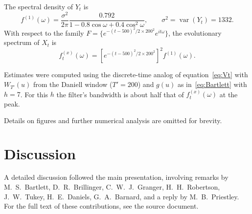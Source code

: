 \documentclass[12pt]{article}
\theoremstyle{definition}
\theoremstyle{plain}
\theoremstyle{remark}
\begin{document}
The spectral density of $Y_t$ is
\begin{equation}
f^{(1)}(\omega) = \frac{\sigma^2}{2\pi} \frac{0.792}{1 - 0.8 \cos \omega + 0.4 \cos^2 \omega}, \qquad \sigma^2 = \operatorname{var}(Y_t) = 1332.
\end{equation}
With respect to the family $F = \{ e^{-(t-500)^2 / 2 \times 200^2} e^{i t \omega}\}$, the evolutionary spectrum of $X_t$ is
\begin{equation}
f^{(x)}_t(\omega) = [e^{-(t-500)^2 / 2 \times 200^2}]^2 f^{(1)}(\omega).
\end{equation}

Estimates were computed using the discrete-time analog of equation~\eqref{eq:Vt} with $W_{T'}(u)$ from the Daniell window ($T'=200$) and $g(u)$ as in~\eqref{eq:Bartlett} with $h=7$. For this $h$ the filter's bandwidth is about half that of $f^{(x)}_t(\omega)$ at the peak.

Details on figures and further numerical analysis are omitted for brevity.

\section*{Discussion}

A detailed discussion followed the main presentation, involving remarks by M.~S.~Bartlett, D.~R.~Brillinger, C.~W.~J.~Granger, H.~H.~Robertson, J.~W.~Tukey, H.~E.~Daniels, G.~A.~Barnard, and a reply by M.~B.~Priestley. For the full text of these contributions, see the source document.
\end{document}
